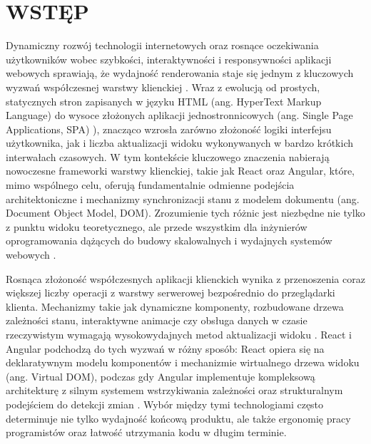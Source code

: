 \documentclass[12pt,openright,twoside]{report}
\begin{document}
\chapter*{WSTĘP}
Dynamiczny rozwój technologii internetowych oraz rosnące oczekiwania użytkowników wobec szybkości, interaktywności i responsywności aplikacji webowych sprawiają, że wydajność renderowania staje się jednym z kluczowych wyzwań współczesnej warstwy klienckiej \cite{Web_Vitals, Nielsen_Usability}. Wraz z ewolucją od prostych, statycznych stron zapisanych w języku HTML (ang. HyperText Markup Language) do wysoce złożonych aplikacji jednostronnicowych (ang. Single Page Applications, SPA) \cite{SPA_Definition}), znacząco wzrosła zarówno złożoność logiki interfejsu użytkownika, jak i liczba aktualizacji widoku wykonywanych w bardzo krótkich interwałach czasowych. W tym kontekście kluczowego znaczenia nabierają nowoczesne frameworki warstwy klienckiej, takie jak React oraz Angular, które, mimo wspólnego celu, oferują fundamentalnie odmienne podejścia architektoniczne i mechanizmy synchronizacji stanu z modelem dokumentu (ang. Document Object Model, DOM). Zrozumienie tych różnic jest niezbędne nie tylko z punktu widoku teoretycznego, ale przede wszystkim dla inżynierów oprogramowania dążących do budowy skalowalnych i wydajnych systemów webowych \cite{React_Up_Running, Angular_Development}.

Rosnąca złożoność współczesnych aplikacji klienckich wynika z przenoszenia coraz większej liczby operacji z warstwy serwerowej bezpośrednio do przeglądarki klienta. Mechanizmy takie jak dynamiczne komponenty, rozbudowane drzewa zależności stanu, interaktywne animacje czy obsługa danych w czasie rzeczywistym wymagają wysokowydajnych metod aktualizacji widoku \cite{High_Perf_JS}. React i Angular podchodzą do tych wyzwań w różny sposób: React opiera się na deklaratywnym modelu komponentów i mechanizmie wirtualnego drzewa widoku (ang. Virtual DOM), podczas gdy Angular implementuje kompleksową architekturę z silnym systemem wstrzykiwania zależności oraz strukturalnym podejściem do detekcji zmian \cite{Angular_Development}. Wybór między tymi technologiami często determinuje nie tylko wydajność końcową produktu, ale także ergonomię pracy programistów oraz łatwość utrzymania kodu w długim terminie.
\end{document}

